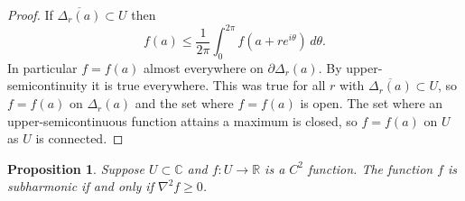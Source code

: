 \documentclass[12pt,openany]{book}
\newcommand{\C}{{\mathbb{C}}}
\newcommand{\R}{{\mathbb{R}}}
\theoremstyle{plain}
\newtheorem{prop}[thm]{Proposition}
\theoremstyle{remark}
\theoremstyle{definition}
\theoremstyle{exercise}
\theoremstyle{example}
\begin{document}
\begin{proof}
If
$\overline{\Delta_r(a)} \subset U$ then
\begin{equation*}
f(a) \leq \frac{1}{2\pi} \int_0^{2\pi} f(a+re^{i\theta})\, d\theta .
\end{equation*}
In particular $f = f(a)$ almost everywhere on $\partial \Delta_r(a)$.
By upper-semicontinuity it is true everywhere.  This was true for all $r$
with $\overline{\Delta_r(a)} \subset U$, so $f=f(a)$ on $\Delta_r(a)$
and the set where $f=f(a)$ is open.  The set where an upper-semicontinuous
function attains a maximum is closed, so $f=f(a)$ on $U$ as $U$ is
connected.
\end{proof}



\begin{prop}
Suppose $U \subset \C$ and $f \colon U \to \R$ is a $C^2$ function.
The function $f$ is subharmonic if and only if
$\nabla^2 f \geq 0$.
\end{prop}
\end{document}
